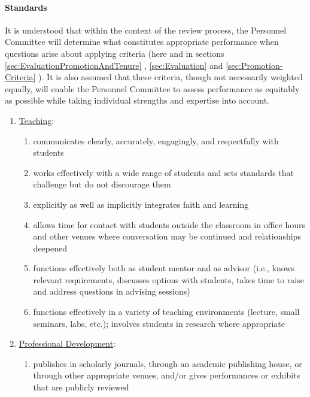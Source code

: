 			\paragraph{Standards}
				\label{sec:Evaluation-Standards}
				It is understood that within the context of the review process, the Personnel Committee will determine what constitutes appropriate performance when questions arise about applying criteria (here and in sections
				\ref{sec:EvaluationPromotionAndTenure}
				,
				\ref{sec:Evaluation}
				and
				\ref{sec:Promotion-Criteria}
				).  It is also assumed that these criteria, though not necessarily weighted equally, will enable the Personnel Committee to assess performance as equitably as possible while taking individual strengths and expertise into account.
				\begin{enumerate}[label=\alph*)]
					\item{\underline{Teaching}:
						\label{par:Evaluation-Standards-Teaching}
						\begin{enumerate}[label=\arabic*)]
							\item{communicates clearly, accurately, engagingly, and respectfully with students}
							\item{works effectively with a wide range of students and sets standards that challenge but do not discourage them}
							\item{explicitly as well as implicitly integrates faith and learning}
							\item{allows time for contact with students outside the classroom in office hours and other venues where conversation may be continued and relationships deepened}
							\item{functions effectively both as student mentor and as advisor (i.e., knows relevant requirements, discusses options with students, takes time to raise and address questions in advising sessions)}
							\item{functions effectively in a variety of teaching environments (lecture, small seminars, labs, etc.); involves students in research where appropriate}
						\end{enumerate}
					}
					\item{\underline{Professional Development}:
						\begin{enumerate}[label=\arabic*)]
							\item{publishes in scholarly journals, through an academic publishing house, or through other appropriate venues, and/or gives performances or exhibits that are publicly reviewed}

\end{enumerate}}
\end{enumerate}
